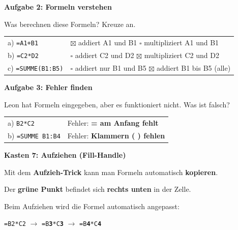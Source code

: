 \documentclass[11pt, a4paper]{article}
\newcommand{\lsg}[1]{\textcolor{loesung}{\textbf{#1}}}
\begin{document}
\vspace{0.3em}


\textbf{\textcolor{fachfarbe}{Aufgabe 2: Formeln verstehen}}

Was berechnen diese Formeln? Kreuze an.

\begin{tabular}{@{}p{3.5cm}p{11cm}@{}}
a) \texttt{=A1+B1} & \lsg{$\boxtimes$} addiert A1 und B1 \quad $\square$ multipliziert A1 und B1 \\[0.5em]
b) \texttt{=C2*D2} & $\square$ addiert C2 und D2 \quad \lsg{$\boxtimes$} multipliziert C2 und D2 \\[0.5em]
c) \texttt{=SUMME(B1:B5)} & $\square$ addiert nur B1 und B5 \quad \lsg{$\boxtimes$} addiert B1 bis B5 (alle)
\end{tabular}

\vspace{0.3em}


\textbf{\textcolor{fachfarbe}{Aufgabe 3: Fehler finden}}

Leon hat Formeln eingegeben, aber es funktioniert nicht. Was ist falsch?

\begin{tabular}{@{}p{4cm}p{10cm}@{}}
a) \texttt{B2*C2} & Fehler: \lsg{= am Anfang fehlt} \\[0.5em]
b) \texttt{=SUMME B1:B4} & Fehler: \lsg{Klammern ( ) fehlen}
\end{tabular}

\vspace{0.3em}


\textbf{\textcolor{fachfarbe}{Kasten 7: Aufziehen (Fill-Handle)}}

\begin{lueckenkasten}
Mit dem \textbf{Aufzieh-Trick} kann man Formeln automatisch \lsg{kopieren}.

\vspace{0.3em}
Der \textbf{grüne Punkt} befindet sich \lsg{rechts unten} in der Zelle.

\vspace{0.3em}
Beim Aufziehen wird die Formel automatisch angepasst:

\texttt{=B2*C2} $\rightarrow$ \texttt{=B\lsg{3}*C\lsg{3}} $\rightarrow$ \texttt{=B\lsg{4}*C\lsg{4}}
\end{lueckenkasten}
\end{document}
